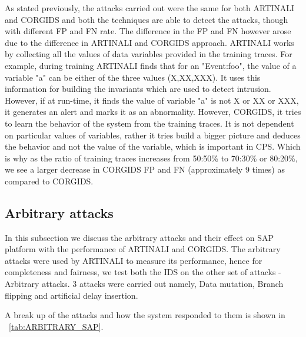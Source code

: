 As stated previously, the attacks carried out were the same for both ARTINALI and CORGIDS and both the techniques are able to detect the attacks, though with different FP and FN rate. The difference in the FP and FN however arose due to the difference in ARTINALI and CORGIDS approach. ARTINALI works by collecting all the values of data variables provided in the training traces. For example, during training ARTINALI finds that for an "Event:foo", the value of a variable "a" can be either of the three values (X,XX,XXX). It uses this information for building the invariants which are used to detect intrusion. However, if at run-time, it finds the value of variable "a" is not X or XX or XXX, it generates an alert and marks it as an abnormality. However, CORGIDS, it tries to learn the behavior of the system from the training traces. It is not dependent on particular values of variables, rather it tries build a bigger picture and deduces the behavior and not the value of the variable, which is important in CPS. Which is why as the ratio of training traces increases from 50:50\% to 70:30\% or 80:20\%, we see a larger decrease in CORGIDS FP and FN (approximately 9 times) as compared to CORGIDS.

\subsection{Arbitrary attacks}
In this subsection we discuss the arbitrary attacks and their effect on SAP platform with the performance of ARTINALI and CORGIDS. The arbitrary attacks were used by ARTINALI to measure its performance, hence for completeness and fairness, we test both the IDS on the other set of attacks - Arbitrary attacks. 3 attacks were carried out namely, Data mutation, Branch flipping and artificial delay insertion.

A break up of the attacks and how the system responded to them is shown in ~\autoref{tab:ARBITRARY_SAP}.


\begin{table}
\centering
  \caption{Arbitrary attacks on SAP platform and its response}
  \label{tab:ARBITRARY_SAP}
\end{table}


